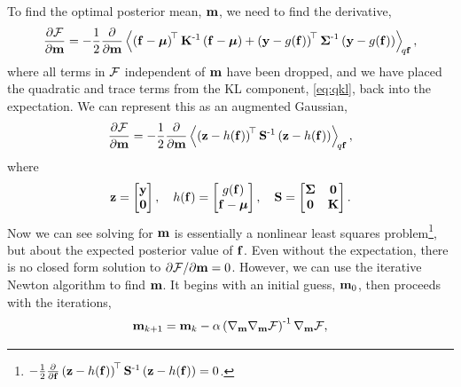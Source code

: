 \documentclass{article} %
\begin{document}
To find the optimal posterior mean, $\pomean$, we need to find the derivative,
\begin{equation}
    \frac{\partial\Fengy}{\partial\pomean} = -\frac{1}{2}
    \frac{\partial}{\partial\pomean} \expec{q\lstate}{
        \brac{\lstate - \prmean}\transpose\prcov\inv
        \brac{\lstate - \prmean}
        + \brac{\obs - \nonlin{\lstate}}\transpose \lcov\inv
            \brac{\obs - \nonlin{\lstate}}},
\end{equation}
where all terms in $\Fengy$ independent of $\pomean$ have been dropped, and we
have placed the quadratic and trace terms from the KL component,
\eqref{eq:qkl}, back into the expectation. We can represent this as an
augmented Gaussian,
\begin{equation}
    \frac{\partial\Fengy}{\partial\pomean} = -\frac{1}{2}
        \frac{\partial}{\partial\pomean}
        \expec{q\lstate}{
        \brac{\augobs - \augnonlin{\lstate}}\transpose\augcov\inv
        \brac{\augobs - \augnonlin{\lstate}}
    },
    \label{eq:augsys}
\end{equation}
where
\begin{equation}
    \augobs = \begin{bmatrix} \obs \\ \mathbf{0} \end{bmatrix}, \quad
    \augnonlin{\lstate} = \begin{bmatrix} \nonlin{\lstate} \\ \lstate - \prmean 
        \end{bmatrix}, \quad
    \augcov = \begin{bmatrix} \lcov & \mathbf{0} \\ \mathbf{0} & \prcov 
        \end{bmatrix}.
\end{equation}
Now we can see solving for $\pomean$ is essentially a nonlinear least squares 
problem\footnote{$-\frac{1}{2}
        \frac{\partial}{\partial\lstate}
        \brac{\augobs - \augnonlin{\lstate}}\transpose\augcov\inv
        \brac{\augobs - \augnonlin{\lstate}} = 0$.}, but about
the expected posterior value of $\lstate$. Even without the expectation, there
is no  closed form solution to $\partial\Fengy/\partial\pomean = 0$.
However, we can use the iterative Newton algorithm to find $\pomean$. It begins
with an initial guess, $\pomean_0$, then proceeds with the iterations,
\begin{equation}
    \pomean_{k+1} = \pomean_k -
    \step\brac{\nabla_\pomean\nabla_\pomean\Fengy}\inv \nabla_\pomean\Fengy,
    \label{eq:newton}
\end{equation}
\end{document}
